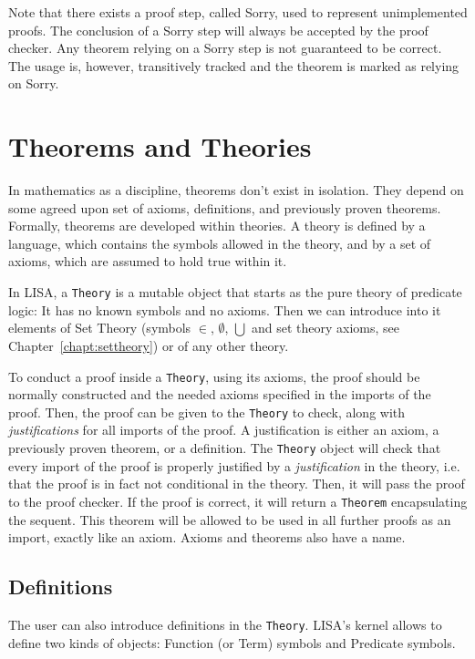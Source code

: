 Note that there exists a proof step, called Sorry, used to  represent unimplemented proofs. The conclusion of a Sorry step will always be accepted by the proof checker. Any theorem relying on a Sorry step is not guaranteed to be correct. The usage is, however, transitively tracked and the theorem is marked as relying on Sorry.


\section{Theorems and Theories}
\label{sec:TheoremsAndTheories}

In mathematics as a discipline, theorems don't exist in isolation. They depend on some agreed upon set of axioms, definitions, and previously proven theorems. Formally, theorems are developed within theories. A theory is defined by a language, which contains the symbols allowed in the theory, and by a set of axioms, which are assumed to hold true within it.

In LISA, a \lstinline|Theory|{} is a mutable object that starts as the pure theory of predicate logic: It has no known symbols and no axioms. Then we can introduce into it elements of Set Theory (symbols $\in$, $\emptyset$, $\bigcup$ and set theory axioms, see Chapter~\ref{chapt:settheory}) or of any other theory.

To conduct a proof inside a \lstinline|Theory|{}, using its axioms, the proof should be normally constructed and the needed axioms specified in the imports of the proof. Then, the proof can be given to the \lstinline|Theory|{} to check, along with \textit{justifications} for all imports of the proof. A justification is either an axiom, a previously proven theorem, or a definition. The \lstinline|Theory|{} object will check that every import of the proof is properly justified by a \textit{justification} in the theory, i.e. that the proof is in fact not conditional in the theory. Then, it will pass the proof to the proof checker. If the proof is correct, it will return a \lstinline|Theorem|{} encapsulating the sequent. This theorem will be allowed to be used in all further proofs as an import, exactly like an axiom. Axioms and theorems also have a name.

\subsection{Definitions}
\label{subsec:definitions}
The user can also introduce definitions in the \lstinline|Theory|{}.
LISA's kernel allows to define two kinds of objects: Function (or Term) symbols and Predicate symbols.


